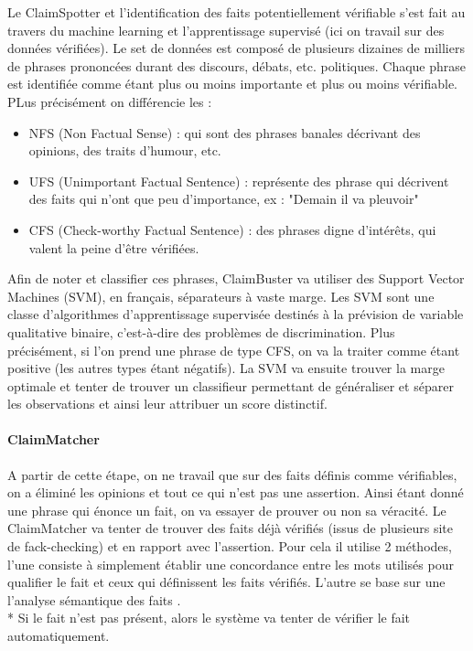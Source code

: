 Le ClaimSpotter et l'identification des faits potentiellement vérifiable s'est fait au travers du machine learning et l'apprentissage supervisé (ici on travail sur des données vérifiées). Le set de données est composé de plusieurs dizaines de milliers de phrases prononcées durant des discours, débats, etc. politiques. Chaque phrase est identifiée comme étant plus ou moins importante et plus ou moins vérifiable. PLus précisément on différencie les : 
\begin{itemize}
    \item NFS (Non Factual Sense) : qui sont des phrases banales décrivant des opinions, des traits d'humour, etc. 
    \item UFS (Unimportant Factual Sentence) : représente des phrase qui décrivent des faits qui n'ont que peu d'importance, ex : "Demain il va pleuvoir"
    \item CFS (Check-worthy Factual Sentence) : des phrases digne d'intérêts, qui valent la peine d'être vérifiées. 
\end{itemize}

Afin de noter et classifier ces phrases, ClaimBuster va utiliser des Support Vector Machines (SVM), en français, séparateurs à vaste marge. Les SVM sont une classe d'algorithmes d'apprentissage supervisée destinés à la prévision de variable qualitative binaire, c'est-à-dire des problèmes de discrimination. Plus précisément, si l'on prend une phrase de type CFS, on va la traiter comme étant positive (les autres types étant négatifs). La SVM va ensuite trouver la marge optimale et tenter de trouver un classifieur permettant de généraliser et séparer les observations et ainsi leur attribuer un score distinctif.

\paragraph{ClaimMatcher}

A partir de cette étape, on ne travail que sur des faits définis comme vérifiables, on a éliminé les opinions et tout ce qui n'est pas une assertion. Ainsi étant donné une phrase qui énonce un fait, on va essayer de prouver ou non sa véracité. Le ClaimMatcher va tenter de trouver des faits déjà vérifiés (issus de plusieurs site de fack-checking) et en rapport avec l'assertion. Pour cela il utilise 2 méthodes, l'une consiste à simplement établir une concordance entre les mots utilisés pour qualifier le fait et ceux qui définissent les faits vérifiés. L'autre se base sur une l'analyse sémantique des faits \cite{rus2013semilar}. 
\\*
Si le fait n'est pas présent, alors le système va tenter de vérifier le fait automatiquement.


